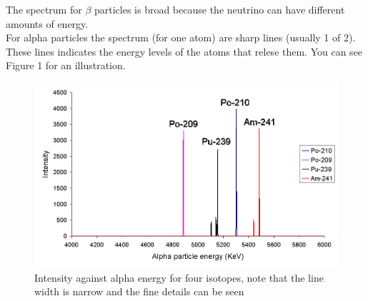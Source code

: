 \documentclass[]{article}
\begin{document}
The spectrum for $\beta$ particles is broad because the neutrino can have different amounts of energy. \\ For alpha particles the spectrum (for one atom) are sharp lines (usually 1 of 2). These lines indicates the energy levels of the atoms that relese them. You can see Figure 1 for an illustration.
\begin{figure}
	\includegraphics[width=\linewidth]{Alpha1spec.png}
	\caption{Intensity against alpha energy for four isotopes, note that the line width is narrow and the fine details can be seen}
	\label{fig:Alpha spectrum}
\end{figure}
\end{document}
